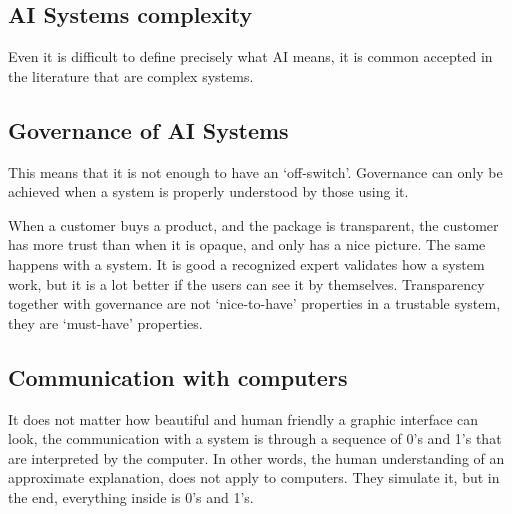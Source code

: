 
\subsection{AI Systems complexity}

Even it is difficult to define precisely what AI means, it is common accepted in the literature that are complex systems.

\subsection{Governance of AI Systems}

This means that it is not enough to have an `off-switch'.
Governance can only be achieved when a system is properly understood by those using it.

When a customer buys a product, and the package is transparent, the customer has more trust than when it is opaque, and only has a nice picture.
The same happens with a system.
It is good a recognized expert validates how a system work, but it is a lot better if the users can see it by themselves.
Transparency together with governance are not `nice-to-have' properties in a trustable system, they are `must-have' properties.

\subsection{Communication with computers}

It does not matter how beautiful and human friendly a graphic interface can look,
the communication with a system is through a sequence of 0's and 1's that are interpreted by the computer.
In other words, the human understanding of an approximate explanation, does not apply to computers.
They simulate it, but in the end, everything inside is 0's and 1's.

